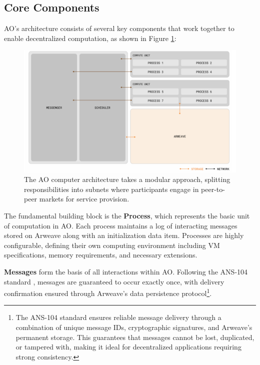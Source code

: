 \subsection{Core Components}

AO's architecture consists of several key components that work together to enable decentralized computation, as shown in Figure \ref{fig:ao_architecture}:

\begin{figure}[ht]
\centering
\includegraphics[width=\columnwidth]{images/image2.png}
\caption{The AO computer architecture takes a modular approach, splitting responsibilities into subnets where participants engage in peer-to-peer markets for service provision. \cite{Williams2024}}
\label{fig:ao_architecture}
\end{figure}

The fundamental building block is the \textbf{Process}, which represents the basic unit of computation in AO. Each process maintains a log of interacting messages stored on Arweave along with an initialization data item. Processes are highly configurable, defining their own computing environment including VM specifications, memory requirements, and necessary extensions.

\textbf{Messages} form the basis of all interactions within AO. Following the ANS-104 standard \cite{ANS104_2024}, messages are guaranteed to occur exactly once, with delivery confirmation ensured through Arweave's data persistence protocol\footnote{The ANS-104 standard ensures reliable message delivery through a combination of unique message IDs, cryptographic signatures, and Arweave's permanent storage. This guarantees that messages cannot be lost, duplicated, or tampered with, making it ideal for decentralized applications requiring strong consistency.}.

